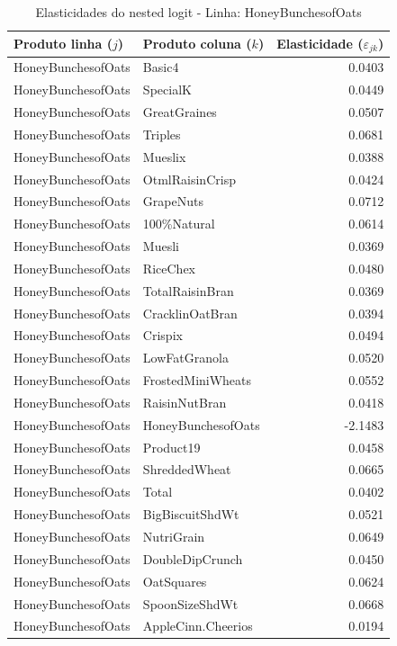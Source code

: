 \begingroup
\begin{table}[H]
\centering
\caption{Elasticidades do nested logit - Linha: HoneyBunchesofOats}
\label{tab:elas-nested-honeybunchesofoats}
\small
\begin{tabular}{llr}
\toprule
Produto linha ($j$) & Produto coluna ($k$) & Elasticidade ($\varepsilon_{jk}$) \\
\midrule
HoneyBunchesofOats & Basic4 & 0.0403 \\
HoneyBunchesofOats & SpecialK & 0.0449 \\
HoneyBunchesofOats & GreatGraines & 0.0507 \\
HoneyBunchesofOats & Triples & 0.0681 \\
HoneyBunchesofOats & Mueslix & 0.0388 \\
HoneyBunchesofOats & OtmlRaisinCrisp & 0.0424 \\
HoneyBunchesofOats & GrapeNuts & 0.0712 \\
HoneyBunchesofOats & 100\%Natural & 0.0614 \\
HoneyBunchesofOats & Muesli & 0.0369 \\
HoneyBunchesofOats & RiceChex & 0.0480 \\
HoneyBunchesofOats & TotalRaisinBran & 0.0369 \\
HoneyBunchesofOats & CracklinOatBran & 0.0394 \\
HoneyBunchesofOats & Crispix & 0.0494 \\
HoneyBunchesofOats & LowFatGranola & 0.0520 \\
HoneyBunchesofOats & FrostedMiniWheats & 0.0552 \\
HoneyBunchesofOats & RaisinNutBran & 0.0418 \\
HoneyBunchesofOats & HoneyBunchesofOats & -2.1483 \\
HoneyBunchesofOats & Product19 & 0.0458 \\
HoneyBunchesofOats & ShreddedWheat & 0.0665 \\
HoneyBunchesofOats & Total & 0.0402 \\
HoneyBunchesofOats & BigBiscuitShdWt & 0.0521 \\
HoneyBunchesofOats & NutriGrain & 0.0649 \\
HoneyBunchesofOats & DoubleDipCrunch & 0.0450 \\
HoneyBunchesofOats & OatSquares & 0.0624 \\
HoneyBunchesofOats & SpoonSizeShdWt & 0.0668 \\
HoneyBunchesofOats & AppleCinn.Cheerios & 0.0194 \\

\end{tabular}
\end{table}
